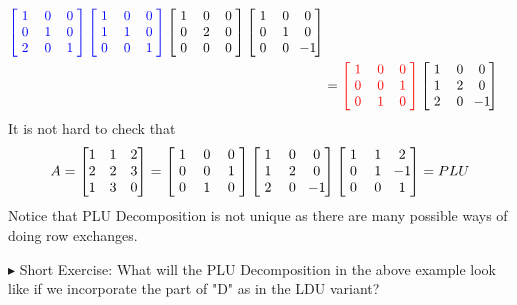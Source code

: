 \begin{solution}
\begin{align*}
\mathcolor{blue}{\left[\begin{array}{@{\,}wc{8pt}wc{6pt}wc{7pt}@{\,}}
1 & 0 & 0 \\
0 & 1 & 0 \\
2 & 0 & 1
\end{array}\right]}
\mathcolor{blue}{\left[\begin{array}{@{\,}wc{8pt}wc{6pt}wc{7pt}@{\,}}
1 & 0 & 0 \\
1 & 1 & 0 \\
0 & 0 & 1
\end{array}\right]}
\left[\begin{array}{@{\,}wc{8pt}wc{6pt}wc{7pt}@{\,}}
1 & 0 & 0 \\
0 & 2 & 0 \\
0 & 0 & 0
\end{array}\right]
\left[\begin{array}{@{\,}wc{8pt}wc{6pt}wc{7pt}@{\,}}
1 & 0 & 0 \\
0 & 1 & 0 \\
0 & 0 & -1
\end{array}\right] \\
&=
\mathcolor{red}{\left[\begin{array}{@{\,}wc{8pt}wc{6pt}wc{7pt}@{\,}}
1 & 0 & 0 \\
0 & 0 & 1 \\
0 & 1 & 0    
\end{array}\right]} 
\left[\begin{array}{@{\,}wc{8pt}wc{6pt}wc{7pt}@{\,}}
1 & 0 & 0 \\
1 & 2 & 0 \\
2 & 0 & -1
\end{array}\right] 
\end{align*}
It is not hard to check that
\begin{align*}
A = \begin{bmatrix}
1 & 1 & 2 \\
2 & 2 & 3 \\
1 & 3 & 0
\end{bmatrix} 
=
\left[\begin{array}{@{\,}wc{8pt}wc{7pt}wc{8pt}@{\,}}
1 & 0 & 0 \\
0 & 0 & 1 \\
0 & 1 & 0    
\end{array}\right] 
\left[\begin{array}{@{\,}wc{8pt}wc{7pt}wc{8pt}@{\,}}
1 & 0 & 0 \\
1 & 2 & 0 \\
2 & 0 & -1
\end{array}\right] 
\left[\begin{array}{@{\,}wc{8pt}wc{7pt}wc{8pt}@{\,}}
1 & 1 & 2 \\
0 & 1 & -1 \\
0 & 0 & 1 
\end{array}\right] 
= PLU
\end{align*}
Notice that PLU Decomposition is not unique as there are many possible ways of doing row exchanges.
\end{solution}
$\blacktriangleright$ Short Exercise: What will the PLU Decomposition in the above example look like if we incorporate the part of "D" as in the LDU variant?\footnotemark

